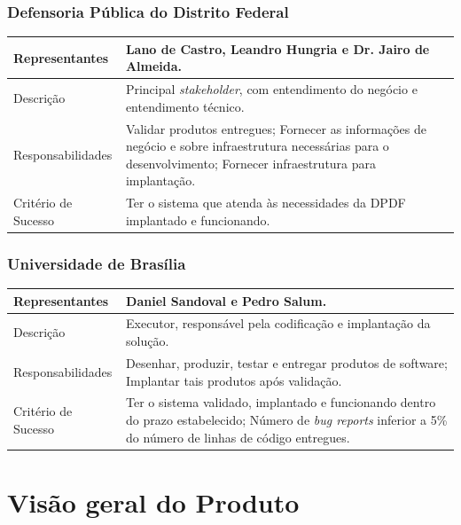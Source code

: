 \documentclass[12pt,a4paper]{report}
\begin{document}
\subsection{Defensoria Pública do Distrito Federal}

\begin{center}
\begin{tabular}{ | l | p{10cm} | }
\hline
Representantes         & Lano de Castro, Leandro Hungria e Dr. Jairo de Almeida. \\
\hline
Descrição              & Principal \textit{stakeholder}, com entendimento do negócio e entendimento técnico.\\
\hline
Responsabilidades      & Validar produtos entregues; Fornecer as informações de negócio e sobre infraestrutura necessárias para o desenvolvimento; Fornecer infraestrutura para implantação.\\
\hline
Critério de Sucesso    & Ter o sistema que atenda às necessidades da DPDF implantado e funcionando.\\
\hline
\end{tabular}
\end{center}

\subsection{Universidade de Brasília}

\begin{center}
\begin{tabular}{ | l | p{10cm} | }
\hline
Representantes         & Daniel Sandoval e Pedro Salum. \\
\hline
Descrição              & Executor, responsável pela codificação e implantação da solução.\\
\hline
Responsabilidades      & Desenhar, produzir, testar e entregar produtos de software; Implantar tais produtos após validação.\\
\hline
Critério de Sucesso    & Ter o sistema validado, implantado e funcionando dentro do prazo estabelecido; Número de \textit{bug reports} inferior a 5\% do número de linhas de código entregues.\\
\hline
\end{tabular}
\end{center}

\chapter{Visão geral do Produto}
\end{document}
